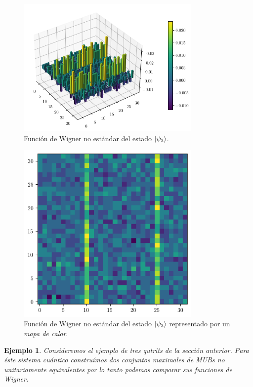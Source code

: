 \documentclass[a4paper]{report}
\newtheorem{example}{Ejemplo}
\begin{document}
  \begin{figure}[ht]
    \centering
    \includegraphics[width=0.8\textwidth]{imgs/wigner-kantor-2-5-s2.png}
    \caption{Función de Wigner no estándar del estado $\ket{\psi_3}$.}
    \label{fig:wigner-kantor-2-5-s2}
  \end{figure}
  \begin{figure}[ht]
    \centering
    \includegraphics[width=0.8\textwidth]{imgs/wigner-kantor-2-5-s2-heat.png}
    \caption{Función de Wigner no estándar del estado
    $\ket{\psi_3}$ representado por un \textit{mapa de
    calor}.}
    \label{fig:wigner-kantor-2-5-s2-heat}
  \end{figure}

  \begin{example}
    Consideremos el ejemplo de tres qutrits de la sección
    anterior. Para éste sistema cuántico construímos dos
    conjuntos maximales de MUBs no unitariamente
    equivalentes por lo tanto podemos comparar sus funciones
    de Wigner.
  \end{example}
  

  \newpage
  \appendix
  

  \newpage
  \printbibliography
\end{document}
